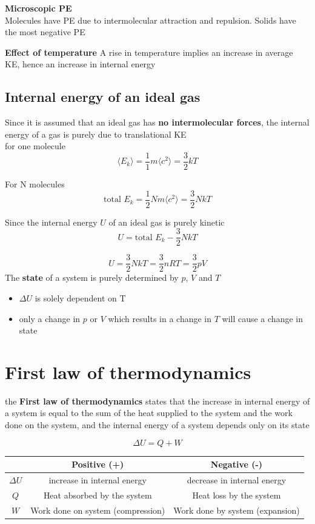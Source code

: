 \documentclass[a4paper, 10pt]{article}
\begin{document}
\textbf{Microscopic PE} \\
Molecules have PE due to intermolecular attraction and repulsion. Solids have the most negative PE

\textbf{Effect of temperature}
A rise in temperature implies an increase in average KE, hence an increase in internal energy

\subsection{Internal energy of an ideal gas}
Since it is assumed that an ideal gas has \textbf{no intermolecular forces}, the internal energy of a gas is purely due to translational KE \\

for one molecule
\[
   \langle E_k \rangle = \frac{1}{1}m\langle c^2 \rangle = \frac{3}{2}kT
\]

For N molecules
\[
   \text{total } E_k = \frac{1}{2}Nm\langle c^2 \rangle  = \frac{3}{2}NkT
\]

Since the internal energy $U$ of an ideal gas is purely kinetic
\[
   U = \text{total } E_k - \frac{3}{2}NkT
\]

\[
U = \frac{3}{2}NkT = \frac{3}{2}nRT = \frac{3}{2}pV 
\]
The \textbf{state} of a system is purely determined by $p$, $V$ and $T$ 
\begin{itemize}
   \item $\Delta U$ is solely dependent on T
   \item only a change in $p$ or $V$  which results in a change in $T$ will cause a change in state
\end{itemize}	

\section{First law of thermodynamics}
\begin{framed}
   the \textbf{First law of thermodynamics} states that the increase in internal energy of a system is equal to the sum of the heat supplied to the system and the work done on the system, and the internal energy of a system depends only on its state

   \[
   \Delta U = Q + W
   \]
\end{framed}	

\begin{center}
   \begin{tabular}{c | c | c}
      & Positive (+) & Negative (-) \\
      \hline
      $\Delta U$ & increase in internal energy & decrease in internal energy  \\
      $Q$ & Heat absorbed by the system & Heat loss by the system \\ 
      $W$ & Work done on system (compression) & Work done by system (expansion) \\
   \end{tabular}
\end{center}
\end{document}
